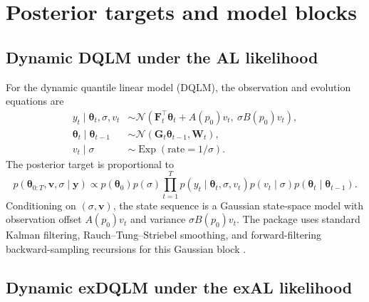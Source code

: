 \documentclass{jss}
\newcommand{\vect}[1]{\boldsymbol{#1}}
\newcommand{\mat}[1]{\mathbf{#1}}
\newcommand{\N}{\mathcal{N}}
\newcommand{\Exp}{\operatorname{Exp}}
\begin{document}
\section{Posterior targets and model blocks}

\subsection{Dynamic DQLM under the AL likelihood}
\label{sec:dyn_dqlm}

For the dynamic quantile linear model (DQLM), the observation and evolution
equations are
\begin{align}
y_t\mid\vect{\theta}_t,\sigma,v_t
&\sim
\N\left(\mat{F}_t^\top\vect{\theta}_t+A(p_0)v_t,\
\sigma B(p_0)v_t\right),\\
\vect{\theta}_t\mid\vect{\theta}_{t-1}
&\sim \N(\mat{G}_t\vect{\theta}_{t-1},\mat{W}_t),\\
v_t\mid\sigma &\sim \Exp(\text{rate}=1/\sigma).
\label{eq:dyn_dqlm_hierarchy}
\end{align}
The posterior target is proportional to
\begin{equation}
p(\vect{\theta}_{0:T},\vect{v},\sigma\mid\vect{y})
\propto
p(\vect{\theta}_0)p(\sigma)
\prod_{t=1}^T
p(y_t\mid\vect{\theta}_t,\sigma,v_t)
p(v_t\mid\sigma)
p(\vect{\theta}_t\mid\vect{\theta}_{t-1}).
\label{eq:dyn_dqlm_joint}
\end{equation}
Conditioning on $(\sigma,\vect{v})$, the state sequence is a Gaussian
state-space model with observation offset $A(p_0)v_t$ and variance
$\sigma B(p_0)v_t$. The package uses standard Kalman filtering,
Rauch--Tung--Striebel smoothing, and forward-filtering backward-sampling
recursions for this Gaussian block \citep{west1997bayesian}.
\label{sec:gaussian_state_update}

\subsection{Dynamic exDQLM under the exAL likelihood}
\label{sec:dyn_exdqlm}
\end{document}
